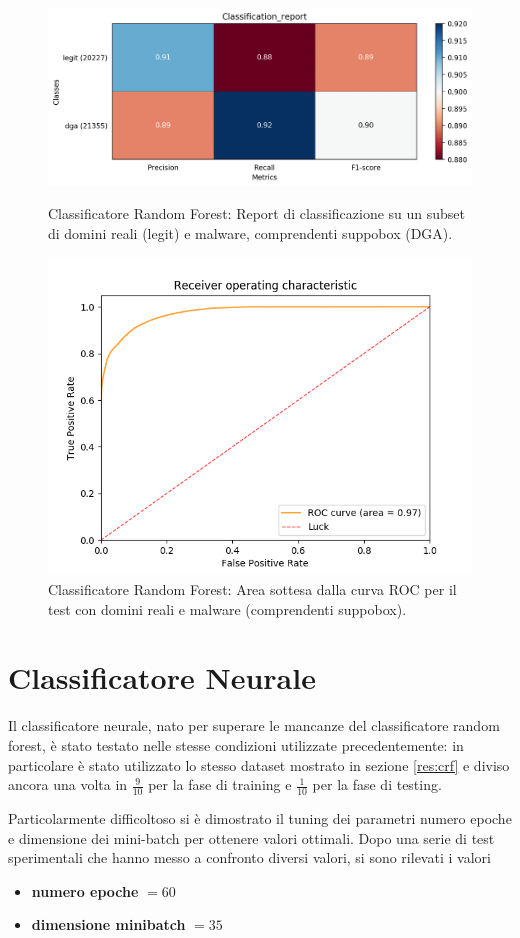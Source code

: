 \begin{figure}[!htbp]
    \centering
    \includegraphics[width=.85\columnwidth]{figures/rndf_tra_sup_sup/class_rep.png}
    \caption{Classificatore Random Forest: Report di classificazione su un subset di domini reali (legit) e malware, comprendenti suppobox (DGA).\label{fig:repall}}

    \centering
    \includegraphics[width=.85\columnwidth]{figures/rndf_tra_sup_sup/roc_plot.png}
    \caption{Classificatore Random Forest: Area sottesa dalla curva ROC per il test con domini reali e malware (comprendenti suppobox).\label{fig:rocall}}
\end{figure}

\section{Classificatore Neurale}
Il classificatore neurale, nato per superare le mancanze del classificatore random forest, è stato testato nelle stesse condizioni utilizzate precedentemente: in particolare è stato utilizzato lo stesso dataset mostrato in sezione \ref{res:crf} e diviso ancora una volta in $\frac{9}{10}$ per la fase di training e $\frac{1}{10}$ per la fase di testing.

Particolarmente difficoltoso si è dimostrato il tuning dei parametri numero epoche e dimensione dei mini-batch per ottenere valori ottimali. Dopo una serie di test sperimentali che hanno messo a confronto diversi valori, si sono rilevati i valori
\begin{itemize}
\item \textbf{numero epoche} $= 60$
\item \textbf{dimensione minibatch} $= 35$ 
\end{itemize}

